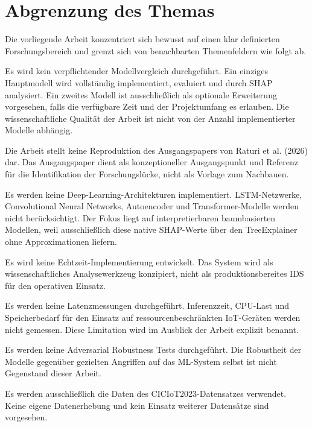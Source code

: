 \section{Abgrenzung des Themas}\label{abgrenzung}

Die vorliegende Arbeit konzentriert sich bewusst auf einen klar definierten Forschungsbereich und grenzt sich von benachbarten Themenfeldern wie folgt ab.

Es wird kein verpflichtender Modellvergleich durchgeführt. Ein einziges Hauptmodell wird vollständig implementiert, evaluiert und durch SHAP analysiert. Ein zweites Modell ist ausschließlich als optionale Erweiterung vorgesehen, falls die verfügbare Zeit und der Projektumfang es erlauben. Die wissenschaftliche Qualität der Arbeit ist nicht von der Anzahl implementierter Modelle abhängig.

Die Arbeit stellt keine Reproduktion des Ausgangspapers von Raturi et al. (2026) dar. Das Ausgangspaper dient als konzeptioneller Ausgangspunkt und Referenz für die Identifikation der Forschungslücke, nicht als Vorlage zum Nachbauen.

Es werden keine Deep-Learning-Architekturen implementiert. LSTM-Netzwerke, Convolutional Neural Networks, Autoencoder und Transformer-Modelle werden nicht berücksichtigt. Der Fokus liegt auf interpretierbaren baumbasierten Modellen, weil ausschließlich diese native SHAP-Werte über den TreeExplainer ohne Approximationen liefern.

Es wird keine Echtzeit-Implementierung entwickelt. Das System wird als wissenschaftliches Analysewerkzeug konzipiert, nicht als produktionsbereites IDS für den operativen Einsatz.

Es werden keine Latenzmessungen durchgeführt. Inferenzzeit, CPU-Last und Speicherbedarf für den Einsatz auf ressourcenbeschränkten IoT-Geräten werden nicht gemessen. Diese Limitation wird im Ausblick der Arbeit explizit benannt.

Es werden keine Adversarial Robustness Tests durchgeführt. Die Robustheit der Modelle gegenüber gezielten Angriffen auf das ML-System selbst ist nicht Gegenstand dieser Arbeit.

Es werden ausschließlich die Daten des CICIoT2023-Datensatzes verwendet. Keine eigene Datenerhebung und kein Einsatz weiterer Datensätze sind vorgesehen.
